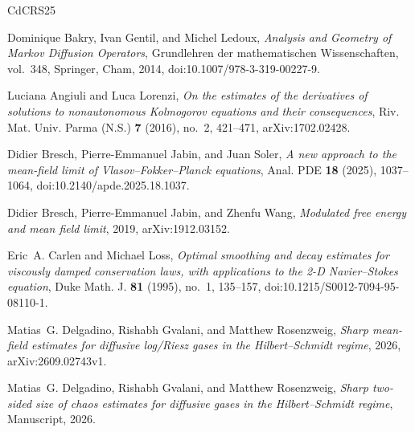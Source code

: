 \documentclass[11pt,reqno]{amsart}
\numberwithin{equation}{section}
\theoremstyle{plain}
\theoremstyle{remark}
\begin{document}
\providecommand{\bysame}{\leavevmode\hbox to3em{\hrulefill}\thinspace}
\providecommand{\MR}{\relax\ifhmode\unskip\space\fi MR }
\providecommand{\MRhref}[2]{%
  \href{http://www.ams.org/mathscinet-getitem?mr=#1}{#2}
}
\providecommand{\href}[2]{#2}
\begin{thebibliography}{CdCRS25}

Dominique Bakry, Ivan Gentil, and Michel Ledoux, \emph{Analysis and Geometry of Markov Diffusion Operators}, Grundlehren der mathematischen Wissenschaften, vol.~348, Springer, Cham, 2014, \href{https://doi.org/10.1007/978-3-319-00227-9}{doi:10.1007/978-3-319-00227-9}.


Luciana Angiuli and Luca Lorenzi, \emph{On the estimates of the derivatives of solutions to nonautonomous Kolmogorov equations and their consequences}, Riv. Mat. Univ. Parma (N.S.) \textbf{7} (2016), no.~2, 421--471, \href{https://arxiv.org/abs/1702.02428}{arXiv:1702.02428}.


Didier Bresch, Pierre-Emmanuel Jabin, and Juan Soler, \emph{A new approach to
  the mean-field limit of {V}lasov--{F}okker--{P}lanck equations}, Anal. PDE
  \textbf{18} (2025), 1037--1064,
  \href{https://doi.org/10.2140/apde.2025.18.1037}{doi:10.2140/apde.2025.18.1037}.


Didier Bresch, Pierre-Emmanuel Jabin, and Zhenfu Wang, \emph{Modulated free
  energy and mean field limit}, 2019,
  \href{https://arxiv.org/abs/1912.03152}{arXiv:1912.03152}.


Eric~A. Carlen and Michael Loss, \emph{Optimal smoothing and decay estimates
  for viscously damped conservation laws, with applications to the 2-{D}
  {N}avier--{S}tokes equation}, Duke Math. J. \textbf{81} (1995), no.~1,
  135--157,
  \href{https://doi.org/10.1215/S0012-7094-95-08110-1}{doi:10.1215/S0012-7094-95-08110-1}.


Matias~G. Delgadino, Rishabh Gvalani, and Matthew Rosenzweig, \emph{Sharp
  mean-field estimates for diffusive log/{R}iesz gases in the
  {H}ilbert--{S}chmidt regime}, 2026,
  \href{https://arxiv.org/abs/2609.02743v1}{arXiv:2609.02743v1}.


Matias~G. Delgadino, Rishabh Gvalani, and Matthew Rosenzweig, \emph{Sharp two-sided size of chaos estimates for diffusive gases in the
  {H}ilbert--{S}chmidt regime}, Manuscript, 2026.



\end{thebibliography}
\end{document}
